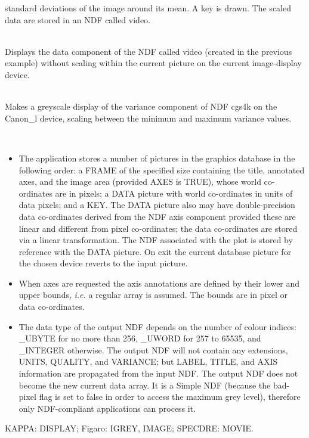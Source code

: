 \documentclass[twoside,11pt]{article}
\newcommand{\sstexamplesubsection}[2]{\sloppy \item{\ssttt #1} \mbox{} \\ #2 }
\newcommand{\sstnotes}[1]{\pagebreak[3] \item[Notes:] \mbox{} \\[1.3ex] #1}
\newcommand{\sstdiytopic}[2]{\goodbreak \item[{\hspace{-0.35em}#1\hspace{-0.35em}:}] \mbox{} \\[1.3ex] #2}
\newcommand{\sstimplementationstatus}[1]{
   \pagebreak[3] \item[{Implementation Status:}] \mbox{} \\[1.3ex] #1}
\newenvironment{sstitemize}{%
  \vspace{-4.3ex}\begin{itemize}}{\end{itemize}}
\newcommand{\sstitemlist}[1]{
  \mbox{} \\
  \vspace{-3.5ex}
  \begin{sstitemize}
     #1
  \end{sstitemize}
}
\newcommand{\sstitem}{\item}
\newcommand{\ssttt}{\tt}
\renewcommand{\sstexamplesubsection}[2]{\item[{\ssttt #1}] \\ #2}
\renewcommand{\sstnotes}[1]{\item[Notes:]
      \begin{description}
         #1
      \end{description}
   }
\renewcommand{\sstdiytopic}[2]{\item[{#1}]
      \begin{description}
         #2
      \end{description}
   }
\renewcommand{\sstimplementationstatus}[1]{\item[Implementation Status:] 
      \begin{description}
         #1
      \end{description}
   }
\newcommand{\sstitemlist}[1]{
      \begin{itemize}
         #1
      \end{itemize}
   }
\begin{document}
{{{         standard deviations of the image around its mean.  A key is
         drawn.  The scaled data are stored in an NDF called video.
      }
      \sstexamplesubsection{
         greyplot video noscale $\backslash$
      }{
         Displays the data component of the NDF called video (created
         in the previous example) without scaling within the current
         picture on the current image-display device.
      }
      \sstexamplesubsection{
         greyplot cgs4k v key mode=ra device=canon\_l
      }{
         Makes a greyscale display of the variance component of NDF
         cgs4k on the Canon\_l device, scaling between the minimum and
         maximum variance values.
      }
   }
   \sstnotes{
      \sstitemlist{

         \sstitem
         The application stores a number of pictures in the graphics
         database in the following order: a FRAME of the specified size
         containing the title, annotated axes, and the image area
         (provided AXES is TRUE), whose world co-ordinates are in pixels;
         a DATA picture with world co-ordinates in units of data pixels;
         and a KEY.  The DATA picture also may have double-precision data
         co-ordinates derived from the NDF axis component provided these
         are linear and different from pixel co-ordinates; the data
         co-ordinates are stored via a linear transformation.  The NDF
         associated with the plot is stored by reference with the DATA
         picture.  On exit the current database picture for the chosen
         device reverts to the input picture.

         \sstitem
         When axes are requested the axis annotations are defined by
         their lower and upper bounds, \emph{i.e.} a regular array is assumed.
         The bounds are in pixel or data co-ordinates.

         \sstitem
         The data type of the output NDF depends on the number of colour
         indices: \_UBYTE for no more than 256, \_UWORD for 257 to 65535,
         and \_INTEGER otherwise.   The output NDF will not contain any
         extensions, UNITS, QUALITY, and VARIANCE; but LABEL, TITLE, and
         AXIS information are propagated from the input NDF.  The output
         NDF does not become the new current data array.  It is a Simple
         NDF (because the bad-pixel flag is set to false in order to
         access the maximum grey level), therefore only NDF-compliant
         applications can process it.
      }
   }
   \sstdiytopic{
      Related Applications
   }{
      KAPPA: DISPLAY; Figaro: IGREY, IMAGE; SPECDRE: MOVIE.
   }
   \sstimplementationstatus{
      \sstitemlist{

}}}
\end{document}
